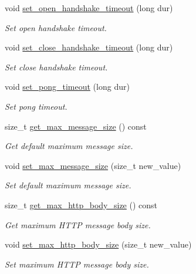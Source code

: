 \begin{DoxyCompactItemize}
\item 
void \hyperlink{classwebsocketpp_1_1endpoint_adb8b3736e30bb8e5ee6add965a948102}{set\+\_\+open\+\_\+handshake\+\_\+timeout} (long dur)
\begin{DoxyCompactList}\small\item\em Set open handshake timeout. \end{DoxyCompactList}\item 
void \hyperlink{classwebsocketpp_1_1endpoint_a54caf799e1cf531d26f67999068d483b}{set\+\_\+close\+\_\+handshake\+\_\+timeout} (long dur)
\begin{DoxyCompactList}\small\item\em Set close handshake timeout. \end{DoxyCompactList}\item 
void \hyperlink{classwebsocketpp_1_1endpoint_abcb25dde6f71933c3dbe517c45ebe5c6}{set\+\_\+pong\+\_\+timeout} (long dur)
\begin{DoxyCompactList}\small\item\em Set pong timeout. \end{DoxyCompactList}\item 
size\+\_\+t \hyperlink{classwebsocketpp_1_1endpoint_a67d0a1ac6e9a332a485f569e71f85882}{get\+\_\+max\+\_\+message\+\_\+size} () const
\begin{DoxyCompactList}\small\item\em Get default maximum message size. \end{DoxyCompactList}\item 
void \hyperlink{classwebsocketpp_1_1endpoint_a6268a63c9ce030941fcfb32ddabf3090}{set\+\_\+max\+\_\+message\+\_\+size} (size\+\_\+t new\+\_\+value)
\begin{DoxyCompactList}\small\item\em Set default maximum message size. \end{DoxyCompactList}\item 
size\+\_\+t \hyperlink{classwebsocketpp_1_1endpoint_ace4f1bdfdf20c13557b34c35c10ca554}{get\+\_\+max\+\_\+http\+\_\+body\+\_\+size} () const
\begin{DoxyCompactList}\small\item\em Get maximum H\+T\+TP message body size. \end{DoxyCompactList}\item 
void \hyperlink{classwebsocketpp_1_1endpoint_a00be7e08ca5c567dd2a4989b8d41d26b}{set\+\_\+max\+\_\+http\+\_\+body\+\_\+size} (size\+\_\+t new\+\_\+value)
\begin{DoxyCompactList}\small\item\em Set maximum H\+T\+TP message body size. \end{DoxyCompactList}\item 

\end{DoxyCompactItemize}

